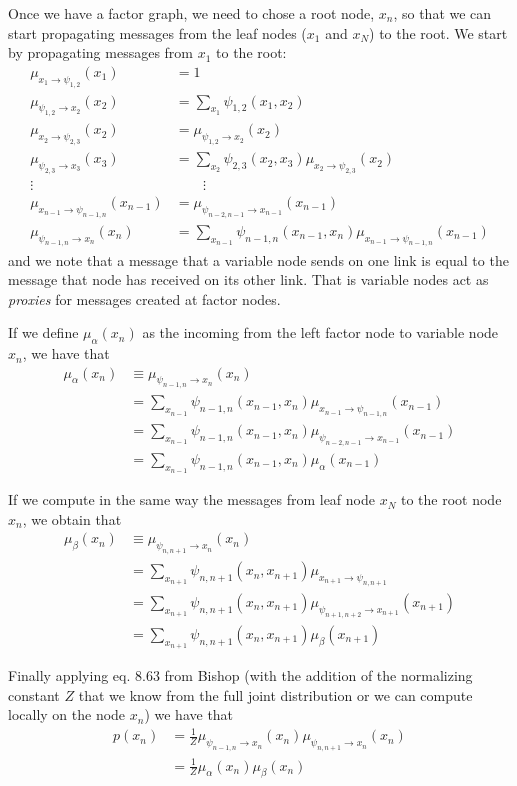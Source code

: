 \documentclass{amsmlaj}
\begin{document}
\begin{problem}
\begin{sol}
	Once we have a factor graph, we need to chose a root node, \eg $x_n$, so that
	we can start propagating messages from the leaf nodes ($x_1$ and $x_N$) to the
	root. We start by propagating messages from $x_1$ to the root:
	\begin{align}
		\mu_{x_1 \to \psi_{1,2}}(x_1)&=1\\
		\mu_{\psi_{1,2} \to x_2}(x_2)&=\sum_{x_1}\psi_{1,2}(x_1,x_2)\\
		\mu_{x_2 \to \psi_{2,3}}(x_2)&=\mu_{\psi_{1,2} \to x_2}(x_2)\\
		\mu_{\psi_{2,3} \to x_3}(x_3)
			&=\sum_{x_2}\psi_{2,3}(x_2,x_3)\mu_{x_2 \to \psi_{2,3}}(x_2)\\
		\vdots\qquad&\qquad\vdots \nonumber \\
		\mu_{x_{n-1} \to \psi_{n-1,n}}(x_{n-1})
			&=\mu_{\psi_{n-2,n-1} \to x_{n-1}}(x_{n-1}) \\
		\mu_{\psi_{n-1,n} \to x_n}(x_n)
			&=\sum_{x_{n-1}}\psi_{n-1,n}(x_{n-1},x_n)\mu_{x_{n-1} \to \psi_{n-1,n}}(x_{n-1})
	\end{align}
	and we note that a message that a variable node sends on one link is equal to
	the message that node has received on its other link. That is variable nodes
	act as \textit{proxies} for messages created at factor nodes.

	If we define $\mu_\alpha(x_n)$ as the incoming from the left factor node to
	variable node $x_n$, we have that
	\begin{align}
		\mu_\alpha(x_n)
		&\equiv\mu_{\psi_{n-1,n} \to x_n}(x_n) \\
		&=\sum_{x_{n-1}}\psi_{n-1,n}(x_{n-1},x_n)\mu_{x_{n-1} \to \psi_{n-1,n}}(x_{n-1}) \\
		&=\sum_{x_{n-1}}\psi_{n-1,n}(x_{n-1},x_n)\mu_{\psi_{n-2,n-1} \to x_{n-1}}(x_{n-1}) \\
		&=\sum_{x_{n-1}}\psi_{n-1,n}(x_{n-1},x_n)\mu_\alpha(x_{n-1})
	\end{align}

	If we compute in the same way the messages from leaf node $x_N$ to the root
	node $x_n$, we obtain that
	\begin{align}
		\mu_\beta(x_n)
		&\equiv \mu_{\psi_{n,n+1} \to x_n}(x_n) \\
		&=\sum_{x_{n+1}} \psi_{n,n+1}(x_n,x_{n+1})\mu_{x_{n+1} \to \psi_{n,n+1}} \\
		&=\sum_{x_{n+1}}\psi_{n,n+1}(x_n,x_{n+1})\mu_{\psi_{n+1,n+2} \to x_{n+1}}(x_{n+1}) \\
		&=\sum_{x_{n+1}}\psi_{n,n+1}(x_n,x_{n+1})\mu_\beta(x_{n+1})
	\end{align}

	Finally applying eq. 8.63 from Bishop (with the addition of the normalizing
	constant $Z$ that we know from the full joint distribution or we can compute
	locally on the node $x_n$) we have that
	\begin{align}
		p(x_n)
		&=\frac{1}{Z}\mu_{\psi_{n-1,n} \to x_n}(x_n) \mu_{\psi_{n,n+1} \to x_n}(x_n) \\
		&=\frac{1}{Z}\mu_\alpha(x_n) \mu_\beta(x_n)
	\end{align}
\end{sol}

\end{problem}
\end{document}

